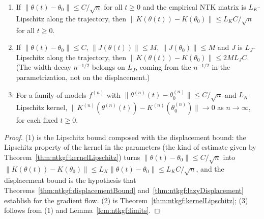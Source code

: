 \begin{theorem}\label{thm:ntkgf:kernelFreeze}
  \leanok
\begin{enumerate}
  \item If $\|\theta(t)-\theta_0\|\le C/\sqrt n$ for all $t\ge0$ and the empirical NTK matrix is $L_K$-Lipschitz along the trajectory, then
        $\|K(\theta(t))-K(\theta_0)\|\le L_KC/\sqrt n$ for all $t\ge0$.
  \item If $\|\theta(t)-\theta_0\|\le C$, $\|J(\theta(t))\|\le M$, $\|J(\theta_0)\|\le M$ and $J$ is $L_J$-Lipschitz along the trajectory, then
        $\|K(\theta(t))-K(\theta_0)\|\le2ML_JC$. (The width decay $n^{-1/2}$ belongs on $L_J$, coming from the $n^{-1/2}$ in the parametrization, not on the displacement.)
  \item For a family of models $f^{(n)}$ with $\|\theta^{(n)}(t)-\theta^{(n)}_0\|\le C/\sqrt n$ and $L_K$-Lipschitz kernel,
        $\|K^{(n)}(\theta^{(n)}(t))-K^{(n)}(\theta^{(n)}_0)\|\to0$ as $n\to\infty$, for each fixed $t\ge0$.
\end{enumerate}
\end{theorem}

\begin{proof}
  \leanok
(1) is the Lipschitz bound composed with the displacement bound: the Lipschitz property of the kernel in the parameters (the kind of estimate given by Theorem~\ref{thm:ntkgf:kernelLipschitz}) turns $\|\theta(t)-\theta_0\|\le C/\sqrt n$ into $\|K(\theta(t))-K(\theta_0)\|\le L_K\|\theta(t)-\theta_0\|\le L_KC/\sqrt n$, and the displacement bound is the hypothesis that Theorems~\ref{thm:ntkgf:displacementBound} and~\ref{thm:ntkgf:lazyDisplacement} establish for the gradient flow. (2) is Theorem~\ref{thm:ntkgf:kernelLipschitz}; (3) follows from (1) and Lemma~\ref{lem:ntkgf:limits}.
\end{proof}

